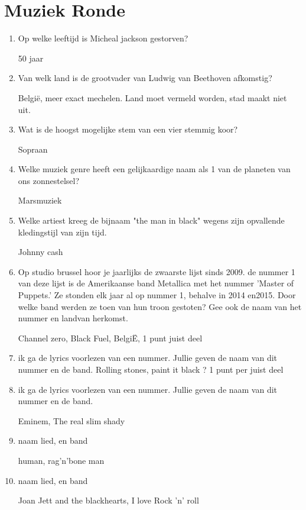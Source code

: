 \section{Muziek Ronde}
\begin{enumerate}
\item{Op welke leeftijd is Micheal jackson gestorven?\par 50 jaar}
\item{Van welk land is de grootvader van Ludwig van Beethoven afkomstig? \par België, meer exact mechelen. Land moet vermeld worden, stad maakt niet uit.}
\item{Wat is de hoogst mogelijke stem van een vier stemmig koor?\par Sopraan}
\item{Welke muziek genre heeft een gelijkaardige naam als 1 van de planeten van ons zonnestelsel?\par Marsmuziek}
\item{Welke artiest kreeg de bijnaam "the man in black" wegens zijn opvallende kledingstijl van zijn tijd.\par Johnny cash}
\item{Op studio brussel hoor je jaarlijks de zwaarste lijst sinds 2009. de nummer 1 van deze lijst is de Amerikaanse band Metallica met het nummer 'Master of Puppets.' Ze stonden elk jaar al op nummer 1, behalve in 2014 en2015. Door welke band werden ze toen van hun troon gestoten? Gee ook de naam van het nummer en landvan herkomst.\par Channel zero, Black Fuel, BelgiË,  1 punt juist deel}
\item{ik ga de lyrics voorlezen van een nummer. Jullie geven de naam van dit nummer en de band.
Rolling stones, paint it black ? 1 punt per juist deel}
\item{ik ga de lyrics voorlezen van een nummer. Jullie geven de naam van dit nummer en de band.\par Eminem, The real slim shady}
\item{ naam lied, en band\par human, rag'n'bone man}
\item{ naam lied, en band\par Joan Jett and the blackhearts, I love Rock 'n' roll}

\end{enumerate}